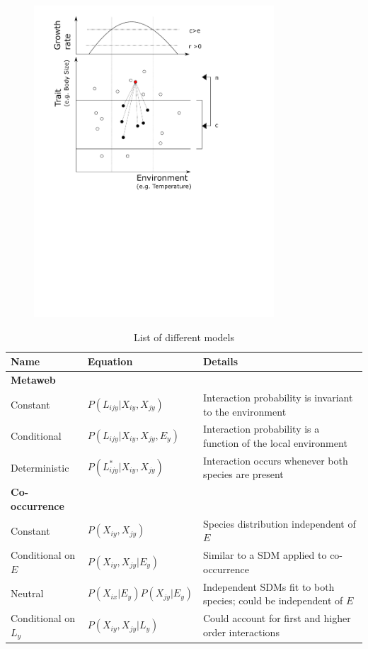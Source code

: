 \documentclass[12pt]{article}
\begin{document}
\begin{figure}[ht!]
	\centering\includegraphics[width=0.8\textwidth]{niche}
\end{figure}

\newpage


\begin{table}[c]
	\centering
	\begin{tabular}{p{4cm}p{4cm}p{6cm}}
	\hline
	Name & Equation & Details \\
	\hline
	\textbf{Metaweb} &   &  \\
	Constant & $P(L_{ijy}|X_{iy},X_{jy})$ & Interaction probability is invariant to the environment \\
	Conditional & $P(L_{ijy}|X_{iy},X_{jy},E_y)$ & Interaction probability is a function of the local environment \\
	Deterministic & $P(L^*_{ijy}|X_{iy},X_{jy})$ & Interaction occurs whenever both species are present \\

	\textbf{Co-occurrence} & &\\
	Constant & $P(X_{iy},X_{jy})$ & Species distribution independent of $E$ \\
	Conditional on $E$ & $P(X_{iy},X_{jy} |E_y)$ & Similar to a SDM applied to co-occurrence \\
	Neutral & $P(X_{ix}|E_y)P(X_{jy}|E_y)$ & Independent SDMs fit to both species; could be independent of $E$ \\
	Conditional on $L_y$ & $P(X_{iy},X_{jy} | L_y)$ & Could account for first and higher order interactions \\
	\hline
	\end{tabular}
	\caption{List of different models}
\end{table}
\end{document}
